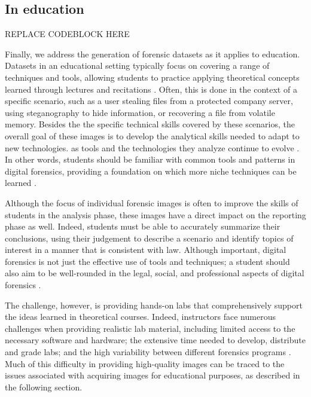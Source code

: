 \documentclass[letterpaper,12pt]{report}
\begin{document}
\subsection{In education}\label{in-education}

REPLACE CODEBLOCK HERE

Finally, we address the generation of forensic datasets as it applies to
education. Datasets in an educational setting typically focus on
covering a range of techniques and tools, allowing students to practice
applying theoretical concepts learned through lectures and recitations
\cite{adelsteinAutomaticallyCreatingRealistic2005}. Often, this is
done in the context of a specific scenario, such as a user stealing
files from a protected company server, using steganography to hide
information, or recovering a file from volatile memory. Besides the the
specific technical skills covered by these scenarios, the overall goal
of these images is to develop the analytical skills needed to adapt to
new technologies. as tools and the technologies they analyze continue to
evolve \cite{cooperStandardsDigitalForensics2010}. In other words,
students should be familiar with common tools and patterns in digital
forensics, providing a foundation on which more niche techniques can be
learned \cite{lawrenceFrameworkDesignWebbased2009}.

Although the focus of individual forensic images is often to improve the
skills of students in the analysis phase, these images have a direct
impact on the reporting phase as well. Indeed, students must be able to
accurately summarize their conclusions, using their judgement to
describe a scenario and identify topics of interest in a manner that is
consistent with law. Although important, digital forensics is not just
the effective use of tools and techniques; a student should also aim to
be well-rounded in the legal, social, and professional aspects of
digital forensics \cite{andersonComparativeStudyTeaching2006}.

The challenge, however, is providing hands-on labs that comprehensively
support the ideas learned in theoretical courses. Indeed, instructors
face numerous challenges when providing realistic lab material,
including limited access to the necessary software and hardware; the
extensive time needed to develop, distribute and grade labs; and the
high variability between different forensics programs
\cite{adelsteinAutomaticallyCreatingRealistic2005,guptaDigitalForensicsLab2022,lawrenceFrameworkDesignWebbased2009}.
Much of this difficulty in providing high-quality images can be traced
to the issues associated with acquiring images for educational purposes,
as described in the following section.
\end{document}
